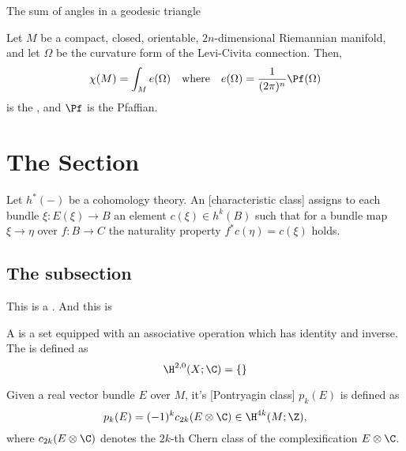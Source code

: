 \begin{corollary}
	The sum of angles in a geodesic triangle
\end{corollary}

\begin{theorem}
	Let $M$ be a compact, closed, orientable, $2n$-dimensional Riemannian manifold, and let $\Omega$ be the curvature form of the Levi-Civita connection. Then,
	\[
		\chi(M) = \int_M e(\Omega)\quad\textrm{where}\quad e(\Omega) = \frac{1}{(2\pi)^n} \Pf(\Omega)
	\]
	is the , and $\Pf$ is the Pfaffian.
\end{theorem}

\section{The Section}

\lipsum[1]

\begin{definition}\label{def:characteristic_class}
	Let $h^*(-)$ be a cohomology theory. An [characteristic class] assigns to each bundle $\xi : E(\xi) \to B$ an element $c(\xi)\in h^k(B)$ such that for a bundle map $\xi \to \eta$ over $f : B \to C$ the naturality property $f^*c(\eta) = c(\xi)$ holds.
\end{definition}

\subsection{The subsection}

This is a . And this is

\lipsum[2]

\begin{definition}\label{def:first}
	A  is a set equipped with an associative operation which has identity and inverse. The  is defined as
	\[
		\H^{2,0}(X; \C) = \{\}
	\]
\end{definition}

\begin{definition}\label{def:pontryagin}
	Given a real vector bundle $E$ over $M$, it's [Pontryagin class] $p_k(E)$ is defined as
	\[
		p_k(E) = (-1)^k c_{2k}(E\otimes \C) \in \H^{4k}(M; \Z),
	\]
	where $c_{2k}(E\otimes \C)$ denotes the $2k$-th Chern class of the complexification $E\otimes \C$.
\end{definition}


